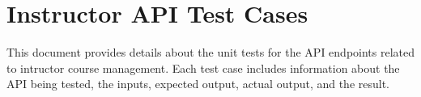 \documentclass[letterpaper,10pt,english]{sphinxmanual}
\begin{document}
\sphinxstepscope


\chapter{Instructor API Test Cases}
\label{\detokenize{src/instructorTestCases:instructor-api-test-cases}}\label{\detokenize{src/instructorTestCases::doc}}
\sphinxAtStartPar
This document provides details about the unit tests for the API endpoints related to intructor course management. Each test case includes information about the API being tested, the inputs, expected output, actual output, and the result.


\section{}
\label{\detokenize{src/instructorTestCases:test-cases-for-add-module}}
\end{document}
